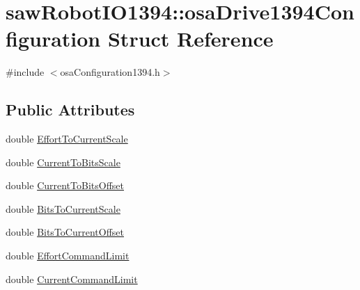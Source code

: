 \hypertarget{structsaw_robot_i_o1394_1_1osa_drive1394_configuration}{\section{saw\-Robot\-I\-O1394\-:\-:osa\-Drive1394\-Configuration Struct Reference}
\label{structsaw_robot_i_o1394_1_1osa_drive1394_configuration}
}


{\ttfamily \#include $<$osa\-Configuration1394.\-h$>$}

\subsection*{Public Attributes}
\begin{DoxyCompactItemize}
\item 
double \hyperlink{structsaw_robot_i_o1394_1_1osa_drive1394_configuration_a8b80905fd42053724c4472214064331d}{Effort\-To\-Current\-Scale}
\item 
double \hyperlink{structsaw_robot_i_o1394_1_1osa_drive1394_configuration_ae9da5e24c71fa90f765cbf0e4730c537}{Current\-To\-Bits\-Scale}
\item 
double \hyperlink{structsaw_robot_i_o1394_1_1osa_drive1394_configuration_ae18ff75e3c9fcb191a167a69e0777f90}{Current\-To\-Bits\-Offset}
\item 
double \hyperlink{structsaw_robot_i_o1394_1_1osa_drive1394_configuration_a6fe0e511700198357e1ef4438e5dcba8}{Bits\-To\-Current\-Scale}
\item 
double \hyperlink{structsaw_robot_i_o1394_1_1osa_drive1394_configuration_a80f8cb255c165a39f998af0121a3350b}{Bits\-To\-Current\-Offset}
\item 
double \hyperlink{structsaw_robot_i_o1394_1_1osa_drive1394_configuration_afe9ad251c2277276b92d1eb828281858}{Effort\-Command\-Limit}
\item 
double \hyperlink{structsaw_robot_i_o1394_1_1osa_drive1394_configuration_adfb9b1bf722a0e9f5e92fa6183118902}{Current\-Command\-Limit}
\end{DoxyCompactItemize}


